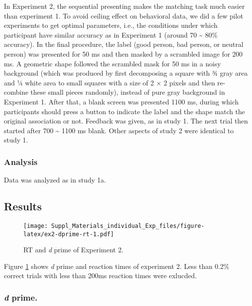 \documentclass[man]{apa6}
\begin{document}
In Experiment 2, the sequential presenting makes the matching task much easier than experiment 1. To avoid ceiling effect on behavioral data, we did a few pilot experiments to get optimal parameters, i.e., the conditions under which participant have similar accuracy as in Experiment 1 (around 70 \textasciitilde{} 80\% accuracy).
In the final procedure, the label (good person, bad person, or neutral person) was presented for 50 ms and then masked by a scrambled image for 200 ms. A geometric shape followed the scrambled mask for 50 ms in a noisy background (which was produced by first decomposing a square with ¾ gray area and ¼ white area to small squares with a size of 2 × 2 pixels and then re-combine these small pieces randomly), instead of pure gray background in Experiment 1. After that, a blank screen was presented 1100 ms, during which participants should press a button to indicate the label and the shape match the original association or not. Feedback was given, as in study 1. The next trial then started after 700 \textasciitilde{} 1100 ms blank. Other aspects of study 2 were identical to study 1.

\hypertarget{analysis}{%
\subsubsection{Analysis}\label{analysis}}

Data was analyzed as in study 1a.

\hypertarget{results-3}{%
\subsection{Results}\label{results-3}}

\begin{figure}
\centering
\texttt{[image: Suppl\_Materials\_individual\_Exp\_files/figure-latex/ex2-dprime-rt-1.pdf]}
\caption{\label{fig:ex2-dprime-rt}RT and \emph{d} prime of Experiment 2.}
\end{figure}

Figure \ref{fig:ex2-dprime-rt} shows \emph{d} prime and reaction times of experiment 2. Less than 0.2\% correct trials with less than 200ms reaction times were exlucded.

\hypertarget{d-prime.}{%
\subsubsection{\texorpdfstring{\emph{d} prime.}{d prime.}}\label{d-prime.}}
\end{document}
